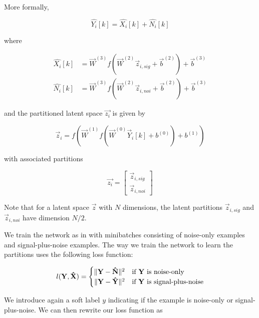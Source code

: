 More formally,

\begin{equation}
\hat{Y_i}[k] = \hat{X_i}[k] + \hat{N_i}[k]
\end{equation}

where

\begin{align}
\hat{X_i}[k] &= \vec{W}^{(3)} f(\vec{W}^{(2)} \vec{z}_{i,sig} + \vec{b}^{(2)}) + \vec{b}^{(3)}\\
\hat{N_i}[k] &= \vec{W}^{(3)} f(\vec{W}^{(2)} \vec{z}_{i,noi} + \vec{b}^{(2)}) + \vec{b}^{(3)}
\end{align}

and the partitioned latent space $\vec{z_i}$ is given by

\begin{equation}
\vec{z}_i = f(\vec{W}^{(1)} f(\vec{W}^{(0)} \vec{Y}_{i}[k] + b^{(0)}) + b^{(1)})
\end{equation}

with associated partitions

\begin{equation}
\vec{z_i} =
    \left[
    \begin{array}{c}
        \vec{z}_{i,sig} \\
        \hline
        \vec{z}_{i,noi}
    \end{array}
    \right]
\end{equation}

Note that for a latent space $\vec{z}$ with $N$ dimensions, the latent partitions $\vec{z}_{i,sig}$ and $\vec{z}_{i,noi}$ have dimension $N/2$.

We train the network as in \cite{stow} with minibatches consisting of noise-only examples and signal-plus-noise examples. The way we train the network to learn the partitions uses the following loss function:

\begin{equation}
l(\vec{Y}, \vec{\hat{X}}) =
    \begin{cases}
        \hfill \norm{\vec{Y}-\vec{\hat{N}}}^{2} \hfill & \text{if $\vec{Y}$ is noise-only}\\
        \hfill \norm{\vec{Y}-\vec{\hat{Y}}}^{2} & \text{if $\vec{Y}$ is signal-plus-noise}
    \end{cases}
\end{equation}

We introduce again a soft label $y$ indicating if the example is noise-only or signal-plus-noise. We can then rewrite our loss function as

